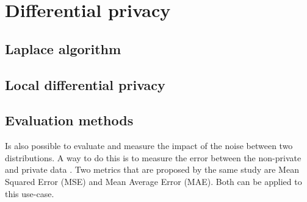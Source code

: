 \section{Differential privacy}
\subsection{Laplace algorithm}
\subsection{Local differential privacy}
\subsection{Evaluation methods} \label{theory:evaluation-dp}
Is also possible to evaluate and measure the impact of the noise between two distributions.
A way to do this is to measure the error between the non-private and private data \cite{del_rey_comprehensive_2020-1}.
Two metrics that are proposed by the same study are Mean Squared Error (MSE) and Mean Average Error (MAE).
Both can be applied to this use-case.
